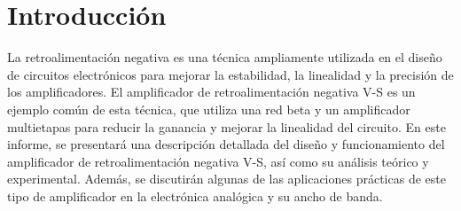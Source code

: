 \documentclass[12pt, letterpaper]{article}
\begin{document}
\newpage
\tableofcontents
\newpage

\section{Introducción}

La retroalimentación negativa es una técnica ampliamente utilizada en el diseño de circuitos electrónicos para mejorar la estabilidad, la linealidad y la precisión de los amplificadores.
El amplificador de retroalimentación negativa V-S es un ejemplo común de esta técnica, que utiliza una red beta y un amplificador multietapas para reducir la ganancia y mejorar la linealidad del circuito.
En este informe, se presentará una descripción detallada del diseño y funcionamiento del amplificador de retroalimentación negativa V-S, así como su análisis teórico y experimental.
Además, se discutirán algunas de las aplicaciones prácticas de este tipo de amplificador en la electrónica analógica y su ancho de banda.
\end{document}
